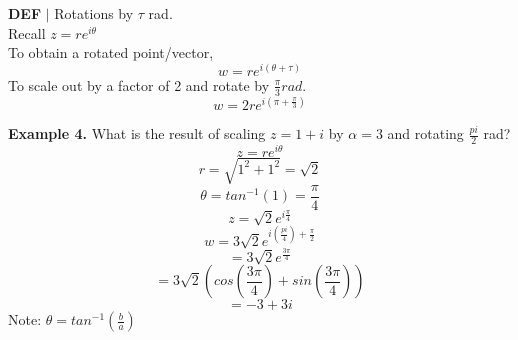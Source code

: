 \documentclass [12pt]{article}
\begin{document}
\begin{framed}
    \noindent\textbf{DEF} $|$ Rotations by $\tau$ rad.\\
    Recall $z=re^{i\theta}$\\
    To obtain a rotated point/vector,
    \[w=re^{i(\theta+\tau)}\]
    To scale out by a factor of 2 and rotate by $\frac{\pi}{3} rad.$
    \[w=2re^{i(\pi+\frac{\pi}{3})}\]
\end{framed}
\noindent\textbf{Example 4.} What is the result of scaling $z=1+i$ by $\alpha=3$ and rotating $\frac{pi}{2}$ rad?\\
\[z=re^{i\theta}\]
\[r=\sqrt{1^2+1^2} = \sqrt{2}\]
\[\theta = tan^{-1}(1) = \frac{\pi}{4}\]
\[z=\sqrt{2}e^{i\frac{\pi}{4}}\]
\[w=3\sqrt{2}e^{i(\frac{pi}{4}) + \frac{\pi}{2}}\]
\[= 3\sqrt{2}e^{\frac{3\pi}{4}}\]
\[=3\sqrt{2}(cos(\frac{3\pi}{4})+sin(\frac{3\pi}{4}))\]
\[=-3+3i\]
Note: $\theta=tan^{-1}(\frac{b}{a})$
\end{document}
